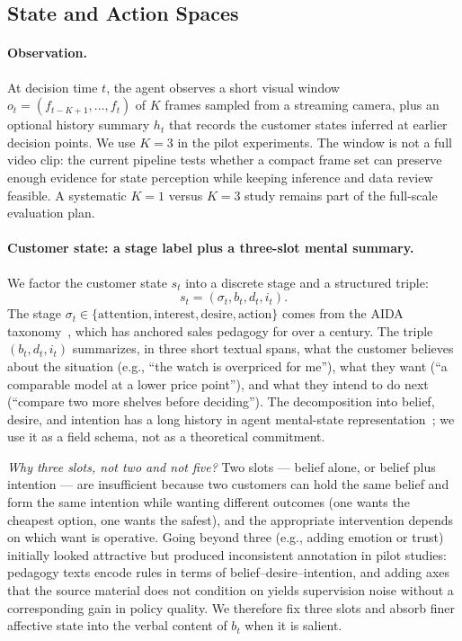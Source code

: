 \documentclass{article}
\begin{document}
\subsection{State and Action Spaces}
\label{sec:method:state}

\paragraph{Observation.}
At decision time $t$, the agent observes a short visual window $o_t = (f_{t-K+1}, \ldots, f_t)$ of $K$ frames sampled from a streaming camera, plus an optional history summary $h_t$ that records the customer states inferred at earlier decision points. We use $K=3$ in the pilot experiments. The window is not a full video clip: the current pipeline tests whether a compact frame set can preserve enough evidence for state perception while keeping inference and data review feasible. A systematic $K=1$ versus $K=3$ study remains part of the full-scale evaluation plan.

\paragraph{Customer state: a stage label plus a three-slot mental summary.}
We factor the customer state $s_t$ into a discrete stage and a structured triple:
\[
s_t = (\sigma_t, b_t, d_t, i_t).
\]
The stage $\sigma_t \in \{\text{attention}, \text{interest}, \text{desire}, \text{action}\}$ comes from the AIDA taxonomy~\cite{Lewis1898,StrongHughes}, which has anchored sales pedagogy for over a century. The triple $(b_t, d_t, i_t)$ summarizes, in three short textual spans, what the customer believes about the situation (e.g., ``the watch is overpriced for me''), what they want (``a comparable model at a lower price point''), and what they intend to do next (``compare two more shelves before deciding''). The decomposition into belief, desire, and intention has a long history in agent mental-state representation~\cite{Bratman,RaoBDI}; we use it as a field schema, not as a theoretical commitment.

\textit{Why three slots, not two and not five?} Two slots --- belief alone, or belief plus intention --- are insufficient because two customers can hold the same belief and form the same intention while wanting different outcomes (one wants the cheapest option, one wants the safest), and the appropriate intervention depends on which want is operative. Going beyond three (e.g., adding emotion or trust) initially looked attractive but produced inconsistent annotation in pilot studies: pedagogy texts encode rules in terms of belief--desire--intention, and adding axes that the source material does not condition on yields supervision noise without a corresponding gain in policy quality. We therefore fix three slots and absorb finer affective state into the verbal content of $b_t$ when it is salient.
\end{document}
